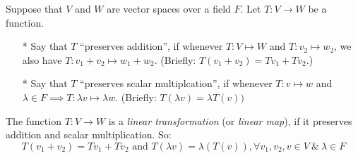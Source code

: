 \documentclass[10pt]{scrartcl}
\begin{document}
Suppose that $V$ and $W$ are vector spaces over a field $F$. Let $T: V \to W$ be a function.

\begin{itemize}
\item[*] Say that $T$ ``preserves addition'', if whenever $T: V \mapsto W$ and $T: v_2 \mapsto w_2$, we also have $T: v_1 + v_2 \mapsto w_1 + w_2$. (Briefly: $T(v_1 + v_2)=Tv_1 +Tv_2$.)
\item[*] Say that $T$ ``preserves scalar multiplcation'', if whenever $T: v \mapsto w$ and $\lambda \in F \implies T: \lambda v \mapsto \lambda w$. (Briefly: $T(\lambda v) = \lambda T(v))$
\end{itemize}\vspace*{5pt}

\begin{definition}The function $T: V \to W$ is a \emph{linear transformation} (or \emph{linear map}), if it preserves addition and scalar multiplication. So:
\[T(v_1 + v_2)=Tv_1 +Tv_2 \text{ and }T(\lambda v) = \lambda(T(v)), \forall v_1,v_2,v \in V ~\&~ \lambda \in F\]
\end{definition}\vspace*{10pt}
\end{document}
